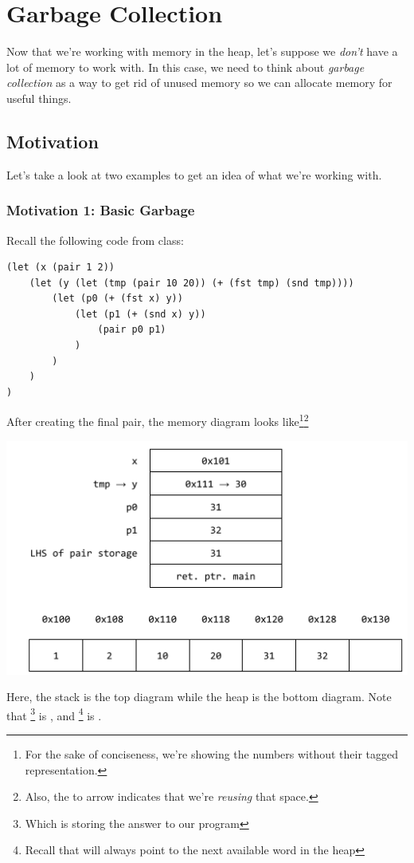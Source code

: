 \section{Garbage Collection}
Now that we're working with memory in the heap, let's suppose we \emph{don't} have a lot of memory to work with. In this case, we need to think about \emph{garbage collection} as a way to get rid of unused memory so we can allocate memory for useful things. 

\subsection{Motivation}
Let's take a look at two examples to get an idea of what we're working with. 

\subsubsection{Motivation 1: Basic Garbage}
Recall the following code from class: 
\begin{verbatim}
(let (x (pair 1 2))
    (let (y (let (tmp (pair 10 20)) (+ (fst tmp) (snd tmp))))
        (let (p0 (+ (fst x) y))
            (let (p1 (+ (snd x) y))
                (pair p0 p1)
            )
        )
    )
)\end{verbatim}

After creating the final pair, the memory diagram looks like\footnote{For the sake of conciseness, we're showing the numbers without their tagged representation.}\footnote{Also, the  to  arrow indicates that we're \emph{reusing} that space.} 
\begin{center}
    \includegraphics[scale=0.6]{assets/stackHeapPairGC1.png}
\end{center}
Here, the stack is the top diagram while the heap is the bottom diagram. Note that \footnote{Which is storing the answer to our program} is , and \footnote{Recall that  will always point to the next available word in the heap} is . 

